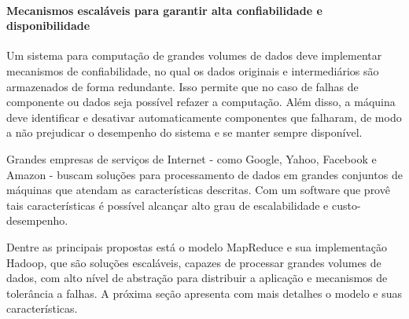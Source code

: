 \paragraph{Mecanismos escaláveis para garantir alta confiabilidade e disponibilidade}
Um sistema para computação de grandes volumes de dados deve implementar mecanismos de confiabilidade, no qual os dados originais e intermediários são armazenados de forma redundante. Isso permite que no caso de falhas de componente ou dados seja possível refazer a computação. Além disso, a máquina deve identificar e desativar automaticamente componentes que falharam, de modo a não prejudicar o desempenho do sistema e se manter sempre disponível. 


Grandes empresas de serviços de Internet - como Google, Yahoo, Facebook e Amazon - buscam soluções para processamento de dados em grandes conjuntos de máquinas que atendam as características descritas. Com um software que provê tais características é possível alcançar alto grau de escalabilidade e custo-desempenho. 

Dentre as principais propostas está o modelo MapReduce e sua implementação Hadoop, que são soluções escaláveis, capazes de processar grandes volumes de dados, com alto nível de abstração para distribuir a aplicação e mecanismos de tolerância a falhas.
A próxima seção apresenta com mais detalhes o modelo e suas características.

